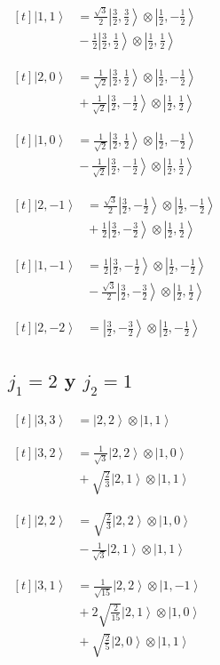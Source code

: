 \documentclass[11pt,a4paper]{article}
\newcommand{\estadocelda}[1]{%
  \begin{minipage}[t]{0.48\linewidth}
  \small\raggedright
  \(\displaystyle\begin{aligned}[t]#1\end{aligned}\)
  \end{minipage}%
}
\newcommand{\ket}[1]{\left|#1\right\rangle}
\begin{document}
\noindent\estadocelda{
\ket{1,1} &= \frac{\sqrt{3}}{2}\ket{\frac{3}{2},\frac{3}{2}}\otimes\ket{\frac{1}{2},-\frac{1}{2}} \\
 &{}-\frac{1}{2}\ket{\frac{3}{2},\frac{1}{2}}\otimes\ket{\frac{1}{2},\frac{1}{2}}
}\hfill\estadocelda{
\ket{2,0} &= \frac{1}{\sqrt{2}}\ket{\frac{3}{2},\frac{1}{2}}\otimes\ket{\frac{1}{2},-\frac{1}{2}} \\
 &{}+\frac{1}{\sqrt{2}}\ket{\frac{3}{2},-\frac{1}{2}}\otimes\ket{\frac{1}{2},\frac{1}{2}}
}\par\addvspace{1.4em}

\noindent\estadocelda{
\ket{1,0} &= \frac{1}{\sqrt{2}}\ket{\frac{3}{2},\frac{1}{2}}\otimes\ket{\frac{1}{2},-\frac{1}{2}} \\
 &{}-\frac{1}{\sqrt{2}}\ket{\frac{3}{2},-\frac{1}{2}}\otimes\ket{\frac{1}{2},\frac{1}{2}}
}\hfill\estadocelda{
\ket{2,-1} &= \frac{\sqrt{3}}{2}\ket{\frac{3}{2},-\frac{1}{2}}\otimes\ket{\frac{1}{2},-\frac{1}{2}} \\
 &{}+\frac{1}{2}\ket{\frac{3}{2},-\frac{3}{2}}\otimes\ket{\frac{1}{2},\frac{1}{2}}
}\par\addvspace{1.4em}

\noindent\estadocelda{
\ket{1,-1} &= \frac{1}{2}\ket{\frac{3}{2},-\frac{1}{2}}\otimes\ket{\frac{1}{2},-\frac{1}{2}} \\
 &{}-\frac{\sqrt{3}}{2}\ket{\frac{3}{2},-\frac{3}{2}}\otimes\ket{\frac{1}{2},\frac{1}{2}}
}\hfill\estadocelda{
\ket{2,-2} &= \ket{\frac{3}{2},-\frac{3}{2}}\otimes\ket{\frac{1}{2},-\frac{1}{2}}
}\par\addvspace{1.4em}

\subsection{\texorpdfstring{$j_1=2$ y $j_2=1$}{j1=2 y j2=1}}

\noindent\estadocelda{
\ket{3,3} &= \ket{2,2}\otimes\ket{1,1}
}\hfill\estadocelda{
\ket{3,2} &= \frac{1}{\sqrt{3}}\ket{2,2}\otimes\ket{1,0} \\
 &{}+\sqrt{\frac{2}{3}}\ket{2,1}\otimes\ket{1,1}
}\par\addvspace{1.4em}

\noindent\estadocelda{
\ket{2,2} &= \sqrt{\frac{2}{3}}\ket{2,2}\otimes\ket{1,0} \\
 &{}-\frac{1}{\sqrt{3}}\ket{2,1}\otimes\ket{1,1}
}\hfill\estadocelda{
\ket{3,1} &= \frac{1}{\sqrt{15}}\ket{2,2}\otimes\ket{1,-1} \\
 &{}+2\sqrt{\frac{2}{15}}\ket{2,1}\otimes\ket{1,0} \\
 &{}+\sqrt{\frac{2}{5}}\ket{2,0}\otimes\ket{1,1}
}\par\addvspace{1.4em}
\end{document}
